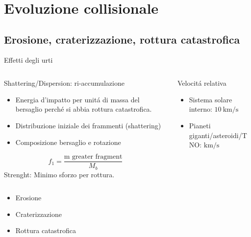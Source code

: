\section{Evoluzione collisionale}

\subsection{Erosione, craterizzazione, rottura catastrofica}

\begin{frame}{Effetti degli urti}
\begin{columns}[T] \begin{column}{0.7\textwidth}
\begin{block}{Shattering/Dispersion: ri-accumulazione}
\begin{itemize}\item Energia d'impatto per unit\'a di massa del bersaglio perch\'e si abbia rottura catastrofica. \item Distribuzione iniziale dei frammenti (shattering) \item Composizione bersaglio e rotazione\end{itemize}
\begin{equation*}f_1=\frac{\text{m greater fragment}}{M_b}\end{equation*}
Strenght: Minimo sforzo per rottura.
\end{block}
\end{column}\begin{column}{0.3\textwidth}
\begin{block}{Velocit\'a relativa}\begin{itemize}\item Sistema solare interno: $\SI{10}{\kilo\meter\per\second}$\item Pianeti giganti/asteroidi/TNO: $\si{\kilo\meter\per\second}$\end{itemize}
\end{block}
\end{column}\end{columns}
\begin{itemize}\item Erosione \item Craterizzazione \item Rottura catastrofica
\end{itemize}
\end{frame}

